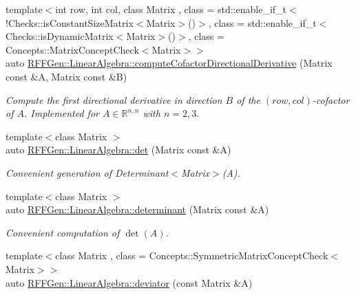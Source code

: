 \begin{DoxyCompactItemize}
{\footnotesize template$<$int row, int col, class Matrix , class  = std\-::enable\-\_\-if\-\_\-t$<$!\-Checks\-::is\-Constant\-Size\-Matrix$<$\-Matrix$>$()$>$, class  = std\-::enable\-\_\-if\-\_\-t$<$\-Checks\-::is\-Dynamic\-Matrix$<$\-Matrix$>$()$>$, class  = Concepts\-::\-Matrix\-Concept\-Check$<$\-Matrix$>$$>$ }\\auto \hyperlink{group__LinearAlgebraGroup_gae69e50e6a283915070eda9758e96aaaf}{R\-F\-F\-Gen\-::\-Linear\-Algebra\-::compute\-Cofactor\-Directional\-Derivative} (Matrix const \&A, Matrix const \&B)
\begin{DoxyCompactList}\small\item\em Compute the first directional derivative in direction $ B $ of the $(row,col)$-\/cofactor of $ A $. Implemented for $ A\in \mathbb{R}^{n,n} $ with $ n=2,3 $. \end{DoxyCompactList}\item 
\hypertarget{group__LinearAlgebraGroup_gaf7734d2f5a3026db85ddaca74322db6a}{{\footnotesize template$<$class Matrix $>$ }\\auto \hyperlink{group__LinearAlgebraGroup_gaf7734d2f5a3026db85ddaca74322db6a}{R\-F\-F\-Gen\-::\-Linear\-Algebra\-::det} (Matrix const \&A)}\label{group__LinearAlgebraGroup_gaf7734d2f5a3026db85ddaca74322db6a}

\begin{DoxyCompactList}\small\item\em Convenient generation of Determinant$<$\-Matrix$>$(\-A). \end{DoxyCompactList}\item 
\hypertarget{group__LinearAlgebraGroup_ga6cbd9a0f6299e29fae3d47c2c229c816}{{\footnotesize template$<$class Matrix $>$ }\\auto \hyperlink{group__LinearAlgebraGroup_ga6cbd9a0f6299e29fae3d47c2c229c816}{R\-F\-F\-Gen\-::\-Linear\-Algebra\-::determinant} (Matrix const \&A)}\label{group__LinearAlgebraGroup_ga6cbd9a0f6299e29fae3d47c2c229c816}

\begin{DoxyCompactList}\small\item\em Convenient computation of $\det(A)$. \end{DoxyCompactList}\item 
\hypertarget{group__LinearAlgebraGroup_ga656ab26a4db8fd4ae758459dba42dfdb}{{\footnotesize template$<$class Matrix , class  = Concepts\-::\-Symmetric\-Matrix\-Concept\-Check$<$\-Matrix$>$$>$ }\\auto \hyperlink{group__LinearAlgebraGroup_ga656ab26a4db8fd4ae758459dba42dfdb}{R\-F\-F\-Gen\-::\-Linear\-Algebra\-::deviator} (const Matrix \&A)}\label{group__LinearAlgebraGroup_ga656ab26a4db8fd4ae758459dba42dfdb}


\end{DoxyCompactItemize}
